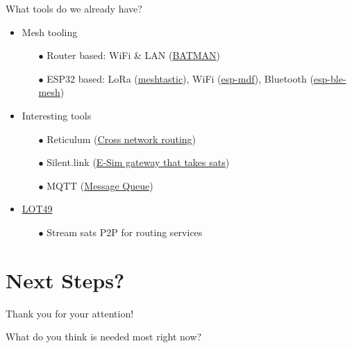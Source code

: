 \documentclass{beamer}
\newcommand{\mydiv}[4]{
  \divider{#1}{#2} (#1-rh.n) node[above] {$#3$}
  (#1-rl.n) node[right] {$#4$} (#1-out)
}
\begin{document}
\begin{frame}{What tools do we already have?}


\begin{itemize}
    \item Mesh tooling
    \begin{itemize}
        \item[$\bullet$] Router based: WiFi \& LAN (\href{https://en.wikipedia.org/wiki/B.A.T.M.A.N.}{BATMAN})
        \item[$\bullet$] ESP32 based: LoRa (\href{https://github.com/meshtastic}{meshtastic}), WiFi (\href{https://github.com/espressif/esp-mdf}{esp-mdf}), Bluetooth (\href{https://github.com/espressif/esp-idf/tree/master/components/bt/esp_ble_mesh}{esp-ble-mesh})
    \end{itemize}

    \item Interesting tools
    \begin{itemize}
        \item[$\bullet$] Reticulum (\href{https://github.com/markqvist/Reticulum}{Cross network routing})
        \item[$\bullet$] Silent.link (\href{https://silent.link/}{E-Sim gateway that takes sats})
        \item[$\bullet$] MQTT (\href{https://github.com/joshpirihi/meshtastic-mqtt}{Message Queue})
    \end{itemize}

    \item \href{https://global-mesh-labs.gitbook.io/lot49/}{LOT49}
    \begin{itemize}
        \item[$\bullet$] Stream sats P2P for routing services
    \end{itemize}
\end{itemize}

\end{frame}

\section{Next Steps?}

\begin{frame}{Thank you for your attention!}


  \centering
  \Huge What do you think is needed most right now?

\end{frame}
\end{document}
